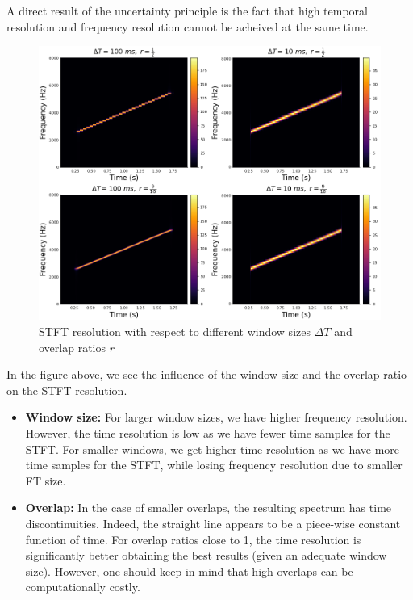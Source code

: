 \documentclass[american,]{article}
\providecommand{\tightlist}{%
  \setlength{\itemsep}{0pt}\setlength{\parskip}{0pt}}
\theoremstyle{definition}
\theoremstyle{definition}
\theoremstyle{definition}
\theoremstyle{remark}
\begin{document}
A direct result of the uncertainty principle is the fact that high temporal resolution
and frequency resolution cannot be acheived at the same time.

\begin{figure}
\centering
\includegraphics{img/stft_resolution.png}
\caption{STFT resolution with respect to different window sizes \(\Delta T\) and overlap ratios \(r\)}
\end{figure}

In the figure above, we see the influence of the window size and the overlap ratio on the
STFT resolution.

\begin{itemize}
\tightlist
\item
  \textbf{Window size:}
  For larger window sizes, we have higher frequency resolution. However, the time resolution is low as we have fewer time samples for the STFT.
  For smaller windows, we get higher time resolution as we have more time samples for the STFT, while losing frequency resolution due to smaller FT size.
\item
  \textbf{Overlap:}
  In the case of smaller overlaps, the resulting spectrum has time discontinuities. Indeed, the straight line appears to be a piece-wise constant function of time.
  For overlap ratios close to 1, the time resolution is significantly better obtaining the best results (given an adequate window size). However, one should keep in mind that high overlaps can be computationally costly.
\end{itemize}
\end{document}
